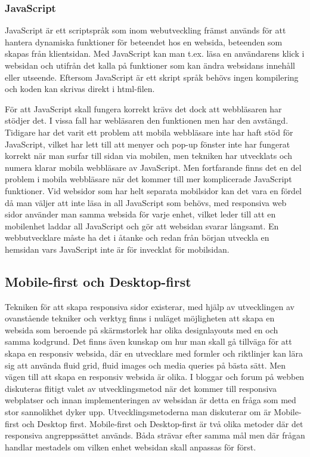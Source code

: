 \documentclass[11pt]{article}
\begin{document}
\subsubsection{JavaScript}
JavaScript är ett scriptspråk som inom webutveckling främst används för att hantera dynamiska funktioner för beteendet hos en websida, beteenden som skapas från klientsidan. Med JavaScript kan man t.ex. läsa en användarens klick i websidan och utifrån det kalla på funktioner som kan ändra websidans innehåll eller utseende. Eftersom JavaScript är ett skript språk behövs ingen kompilering och koden kan skrivas direkt i html-filen.

För att JavaScript skall fungera korrekt krävs det dock att webbläsaren har stödjer det. I vissa fall har webläsaren den funktionen men har den avstängd. Tidigare har det varit ett problem att mobila webbläsare inte har haft stöd för JavaScript, vilket har lett till att menyer och pop-up fönster inte har fungerat korrekt när man surfar till sidan via mobilen, men tekniken har utvecklats och numera klarar mobila webbläsare av JavaScript. Men fortfarande finns det en del problem i mobila webbläsare när det kommer till mer komplicerade JavaScript funktioner. Vid websidor som har helt separata mobilsidor kan det vara en fördel då man väljer att inte läsa in all JavaScript som behövs, med responsiva web sidor använder man samma websida för varje enhet, vilket leder till att en mobilenhet laddar all JavaScript och gör att websidan svarar långsamt. En webbutvecklare måste ha det i åtanke och redan från början utveckla en hemsidan vars JavaScript inte är för invecklat för mobilsidan.

\subsection{Mobile-first och Desktop-first}
Tekniken för att skapa responsiva sidor existerar, med hjälp av utvecklingen av ovanstående tekniker och verktyg finns i nuläget möjligheten att skapa en websida som beroende på skärmstorlek har olika designlayouts med en och samma kodgrund. Det finns även kunskap om hur man skall gå tillväga för att skapa en responsiv websida, där en utvecklare med formler och riktlinjer kan lära sig att använda fluid grid, fluid images och media queries på bästa sätt. Men vägen till att skapa en responsiv websida är olika.  I bloggar och forum på webben diskuteras flitigt valet av utvecklingsmetod när det kommer till responsiva webplatser och innan implementeringen av websidan är detta en fråga som med stor sannolikhet dyker upp. Utvecklingsmetoderna man diskuterar om är Mobile-first och Desktop first. Mobile-first och Desktop-first är två olika metoder där det responsiva angreppssättet används. Båda strävar efter samma mål men där frågan handlar mestadels om vilken enhet websidan skall anpassas för först. 
\end{document}
